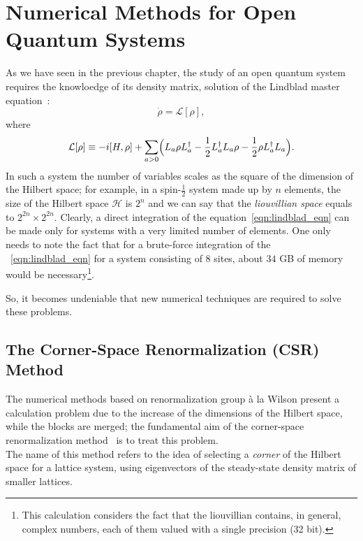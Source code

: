 \chapter{Numerical Methods for Open Quantum Systems}
\label{Chapter2}
As we have seen in the previous chapter, the study of an open quantum system requires the knowloedge of its density matrix, solution of the Lindblad master equation~\cite{presk:quant_info}:
\begin{equation*}
    \dot{\rho} = \mathcal{L}[\rho],
\end{equation*}
where
\begin{equation}
\label{eqn:lindblad_eqn}
    \mathcal{L}[\rho] \equiv -i[H, \rho] +\sum_{a>0}\Bigl(L_a\rho L_a^{\dagger} - \frac{1}{2}L_a^{\dagger}L_a\rho - \frac{1}{2}\rho L_a^{\dagger}L_a\Bigl).
\end{equation}
In such a system the number of variables scales as the square of the dimension of the Hilbert space; for example, in a spin-$\frac{1}{2}$ system made up by $n$ elements, the size of the Hilbert space $\mathcal{H}$ is $2^n$ and we can say that the \emph{liouvillian space} equals to $2^{2n} \times 2^{2n}$. Clearly, a direct integration of the equation~\ref{eqn:lindblad_eqn} can be made only for systems with a very limited number of elements. One only needs to note the fact that for a brute-force integration of the ~\ref{eqn:lindblad_eqn} for a system consisting of $8$ sites, about $34$ GB of memory would be necessary\footnote{This calculation considers the fact that the liouvillian contains, in general, complex numbers, each of them valued with a single precision (32 bit).}.

So, it becomes undeniable that new numerical techniques are required to solve these problems. 

\section{The Corner-Space Renormalization (CSR) Method}
\label{chapter2_csr}
The numerical methods based on renormalization group à la Wilson present a calculation problem due to the increase of the dimensions of the Hilbert space, while the blocks are merged; the fundamental aim of the corner-space renormalization method~\cite{PhysRevLett.115.080604} is to treat this problem. \\
The name of this method refers to the idea of selecting a \emph{corner} of the Hilbert space for a lattice system, using eigenvectors of the steady-state density matrix of smaller lattices.

